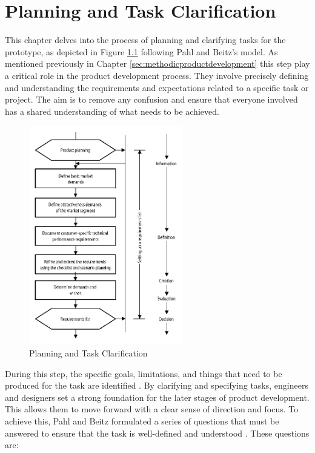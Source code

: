 \chapter{Planning and Task Clarification}

This chapter delves into the process of planning and clarifying tasks for the prototype, as depicted in Figure \ref{fig:planning} following Pahl and Beitz's model. As mentioned previously in Chapter \ref{sec:methodicproductdevelopment} this step play a critical role in the product development process. They involve precisely defining and understanding the requirements and expectations related to a specific task or project. The aim is to remove any confusion and ensure that everyone involved has a shared understanding of what needs to be achieved.

\begin{figure}[ht!]
    \centering
    \includegraphics[width=0.6\textwidth]{texs/Part1/chapter2/image/planning.png}
    \caption{Planning and Task Clarification \cite{Pahl07m}}
    \label{fig:planning}
\end{figure}

During this step, the specific goals, limitations, and things that need to be produced for the task are identified \cite{Pahl07a}. By clarifying and specifying tasks, engineers and designers set a strong foundation for the later stages of product development. This allows them to move forward with a clear sense of direction and focus. To achieve this, Pahl and Beitz formulated a series of questions that must be answered to ensure that the task is well-defined and understood \cite{Pahl07a}. These questions are:


